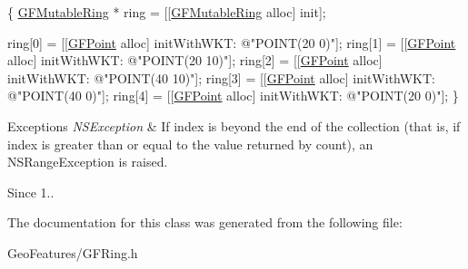 \begin{DoxyCode}
\{
   \hyperlink{interface_g_f_mutable_ring}{GFMutableRing} * ring = [[\hyperlink{interface_g_f_mutable_ring}{GFMutableRing} alloc] init];

  ring[0] = [[\hyperlink{interface_g_f_point}{GFPoint} alloc] initWithWKT: \textcolor{stringliteral}{@"POINT(20 0)"}];
  ring[1] = [[\hyperlink{interface_g_f_point}{GFPoint} alloc] initWithWKT: \textcolor{stringliteral}{@"POINT(20 10)"}];
  ring[2] = [[\hyperlink{interface_g_f_point}{GFPoint} alloc] initWithWKT: \textcolor{stringliteral}{@"POINT(40 10)"}];
  ring[3] = [[\hyperlink{interface_g_f_point}{GFPoint} alloc] initWithWKT: \textcolor{stringliteral}{@"POINT(40 0)"}];
  ring[4] = [[\hyperlink{interface_g_f_point}{GFPoint} alloc] initWithWKT: \textcolor{stringliteral}{@"POINT(20 0)"}];
\}
\end{DoxyCode}



\begin{DoxyExceptions}{Exceptions}
{\em N\+S\+Exception} & If index is beyond the end of the collection (that is, if index is greater than or equal to the value returned by count), an N\+S\+Range\+Exception is raised.\\
\hline
\end{DoxyExceptions}
\begin{DoxySince}{Since}
1.. 
\end{DoxySince}


The documentation for this class was generated from the following file\+:\begin{DoxyCompactItemize}
\item 
Geo\+Features/G\+F\+Ring.\+h\end{DoxyCompactItemize}

